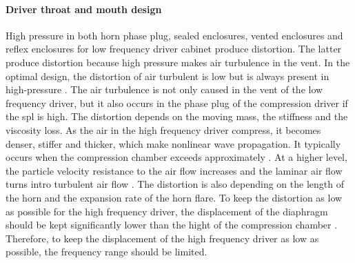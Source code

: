 \paragraph{Driver throat and mouth design} High pressure in both horn phase plug, sealed enclosures, vented enclosures and reflex enclosures for low frequency driver cabinet produce distortion. The latter produce distortion because high pressure makes air turbulence in the vent. In the optimal design, the distortion of air turbulent is low but is always present in high-pressure \citep{roozen1998reduction}. The air turbulence is not only caused in the vent of the low frequency driver, but it also occurs in the phase plug of the compression driver if the \gls{spl} is high. The distortion depends on the moving mass, the stiffness and the viscosity loss. As the air in the high frequency driver compress, it becomes denser, stiffer and thicker, which make nonlinear wave propagation. It typically occurs when the compression chamber exceeds approximately . At a higher level, the particle velocity resistance to the air flow increases and the laminar air flow turns intro turbulent air flow \citep{czerwinski1999air}. The distortion is also depending on the length of the horn and the expansion rate of the horn flare. To keep the distortion as low as possible for the high frequency driver, the displacement of the diaphragm should be kept significantly lower than the hight of the compression chamber \citep{voishvillo2004comparative}. Therefore, to keep the displacement of the high frequency driver as low as possible, the frequency range should be limited.



